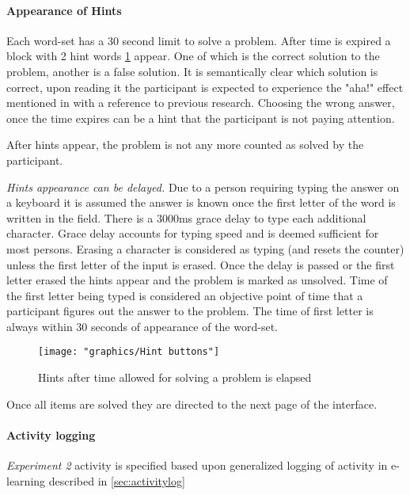 		\paragraph{Appearance of Hints}
		
		Each word-set has a 30 second limit to solve a problem. After time is expired a block with 2 hint words \ref{fig:hint-buttons} appear. One of which is the correct solution to the problem, another is a false solution. It is semantically clear which solution is correct, upon reading it the participant is expected to experience the "aha!" effect mentioned in \cite[p.634]{Bowden} with a reference to previous research. Choosing the wrong answer, once the time expires can be a hint that the participant is not paying attention.
		
		After hints appear, the problem is not any more counted as solved by the participant. 
		
		\textit{Hints appearance can be delayed.} Due to a person requiring typing the answer on a keyboard it is assumed the answer is known once the first letter of the word is written in the field. There is a 3000ms grace delay to type each additional character. Grace delay accounts for typing speed and is deemed sufficient for most persons. Erasing a character is considered as typing (and resets the counter) unless the first letter of the input is erased. Once the delay is passed or the first letter erased the hints appear and the problem is marked as unsolved. Time of the first letter being typed is considered an objective point of time that a participant figures out the answer to the problem. The time of first letter is always within 30 seconds of appearance of the word-set.
		
		\begin{figure}
			\centering
			\texttt{[image: "graphics/Hint buttons"]}
			\caption{Hints after time allowed for solving a problem is elapsed}
			\label{fig:hint-buttons}
		\end{figure}
		
		
		Once all items are solved they are directed to the next page of the interface.
				
		\paragraph{Activity logging} \textit{Experiment 2} activity is specified based upon generalized logging of activity in e-learning described in \ref{sec:activitylog}
		

